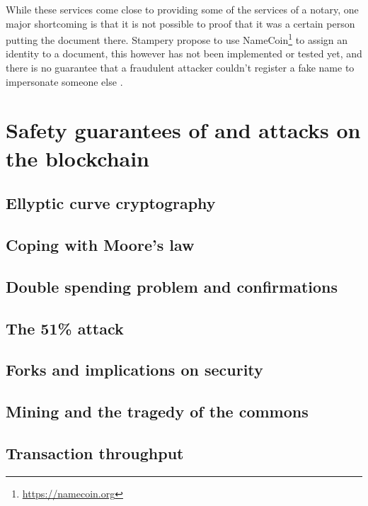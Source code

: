 \documentclass[12pt,msc,a4paper,oneside]{ucl_thesis}
\begin{document}
While these services come close to providing some of the services of a notary, one major shortcoming is that it is not possible to proof that it was a certain person putting the document there. Stampery propose to use NameCoin\footnote{\url{https://namecoin.org}} to assign an identity to a document, this however has not been implemented or tested yet, and there is no guarantee that a fraudulent attacker couldn't register a fake name to impersonate someone else \cite{notary:does_blockchain_notary_work} \cite{notary:stampery_medium}.


\chapter{Safety guarantees of and attacks on the blockchain}

\section{Ellyptic curve cryptography}
\section{Coping with Moore's law}
\section{Double spending problem and confirmations}
\section{The 51\% attack}
\section{Forks and implications on security}
\section{Mining and the tragedy of the commons}
\section{Transaction throughput}
\end{document}
